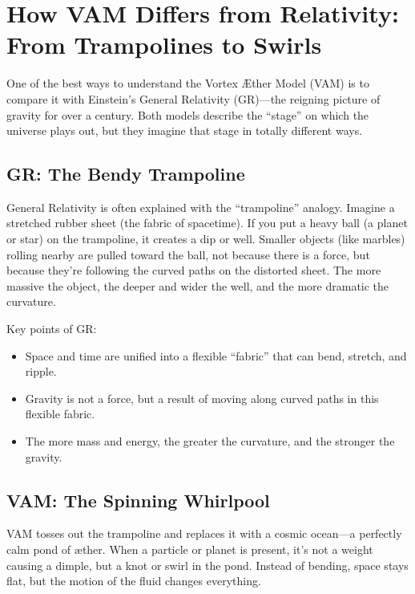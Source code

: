 
\section{How VAM Differs from Relativity: From Trampolines to Swirls}

One of the best ways to understand the Vortex Æther Model (VAM) is to compare it with Einstein’s General Relativity (GR)—the reigning picture of gravity for over a century. Both models describe the “stage” on which the universe plays out, but they imagine that stage in totally different ways.


\subsection*{GR: The Bendy Trampoline}

General Relativity is often explained with the “trampoline” analogy. Imagine a stretched rubber sheet (the fabric of spacetime). If you put a heavy ball (a planet or star) on the trampoline, it creates a dip or well. Smaller objects (like marbles) rolling nearby are pulled toward the ball, not because there is a force, but because they’re following the curved paths on the distorted sheet. The more massive the object, the deeper and wider the well, and the more dramatic the curvature.


Key points of GR:


\begin{itemize}

\item
Space and time are unified into a flexible “fabric” that can bend, stretch, and ripple.




\item
Gravity is not a force, but a result of moving along curved paths in this flexible fabric.




\item
The more mass and energy, the greater the curvature, and the stronger the gravity.




\end{itemize}

\subsection*{VAM: The Spinning Whirlpool}

VAM tosses out the trampoline and replaces it with a cosmic ocean—a perfectly calm pond of æther. When a particle or planet is present, it’s not a weight causing a dimple, but a knot or swirl in the pond. Instead of bending, space stays flat, but the motion of the fluid changes everything.


